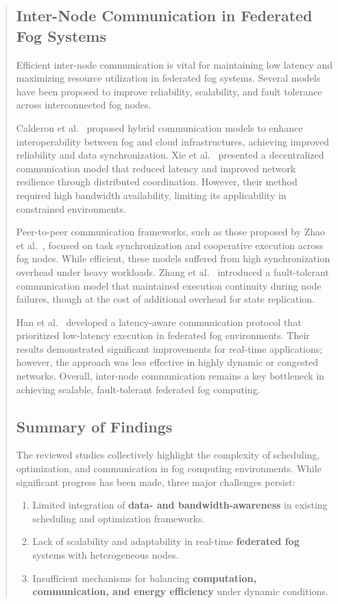 \documentclass[conference]{IEEEtran}
\begin{document}
\begin{abstract}
\subsection{Inter-Node Communication in Federated Fog Systems}

Efficient inter-node communication is vital for maintaining low latency and maximizing resource utilization in federated fog systems. Several models have been proposed to improve reliability, scalability, and fault tolerance across interconnected fog nodes.

Calderon et al.~\cite{calderon2018legacy} proposed hybrid communication models to enhance interoperability between fog and cloud infrastructures, achieving improved reliability and data synchronization. Xie et al.~\cite{xie2023decentralized} presented a decentralized communication model that reduced latency and improved network resilience through distributed coordination. However, their method required high bandwidth availability, limiting its applicability in constrained environments.

Peer-to-peer communication frameworks, such as those proposed by Zhao et al.~\cite{zhao2022peertopeer}, focused on task synchronization and cooperative execution across fog nodes. While efficient, these models suffered from high synchronization overhead under heavy workloads. Zhang et al.~\cite{zhang2022faulttolerant} introduced a fault-tolerant communication model that maintained execution continuity during node failures, though at the cost of additional overhead for state replication.

Han et al.~\cite{wang2023latencyaware} developed a latency-aware communication protocol that prioritized low-latency execution in federated fog environments. Their results demonstrated significant improvements for real-time applications; however, the approach was less effective in highly dynamic or congested networks. Overall, inter-node communication remains a key bottleneck in achieving scalable, fault-tolerant federated fog computing.

\subsection{Summary of Findings}

The reviewed studies collectively highlight the complexity of scheduling, optimization, and communication in fog computing environments. While significant progress has been made, three major challenges persist:
\begin{enumerate}
    \item Limited integration of \textbf{data- and bandwidth-awareness} in existing scheduling and optimization frameworks.
    \item Lack of scalability and adaptability in real-time \textbf{federated fog} systems with heterogeneous nodes.
    \item Insufficient mechanisms for balancing \textbf{computation, communication, and energy efficiency} under dynamic conditions.
\end{enumerate}


\end{abstract}
\end{document}
